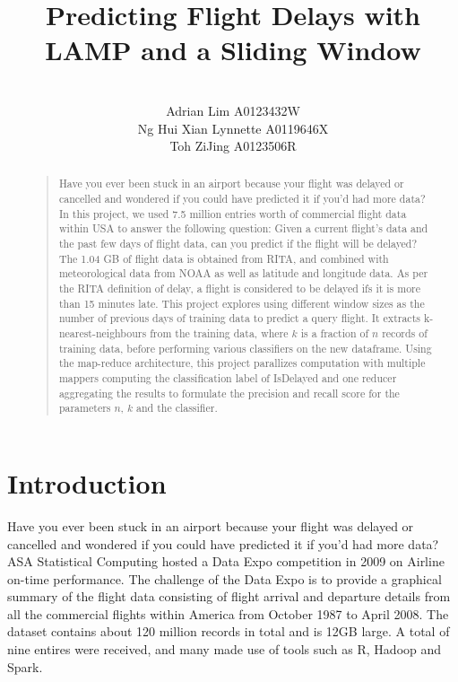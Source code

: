 \documentclass[letterpaper,11pt]{article}
\begin{document}
\title{Predicting Flight Delays with LAMP and a Sliding Window}
\author{\\Adrian Lim A0123432W \\
Ng Hui Xian Lynnette A0119646X \\
Toh ZiJing A0123506R }
\maketitle
\begin{abstract}
\begin{quote}
Have you ever been stuck in an airport because your flight was delayed or cancelled and wondered if you could have predicted it if you'd had more data? In this project, we used 7.5 million entries worth of commercial flight data within USA to answer the following question: Given a current flight's data and the past few days of flight data, can you predict if the flight will be delayed? The 1.04 GB of flight data is obtained from RITA, and combined with meteorological data from NOAA as well as latitude and longitude data. As per the RITA definition of delay, a flight is considered to be delayed ifs it is more than 15 minutes late. This project explores using different window sizes as the number of previous days of training data to predict a query flight. It extracts k-nearest-neighbours from the training data, where $k$ is a fraction of $n$ records of training data, before performing various classifiers on the new dataframe. Using the map-reduce architecture, this project parallizes computation with multiple mappers computing the classification label of IsDelayed and one reducer aggregating the results to formulate the precision and recall score for the parameters $n$, $k$ and the classifier.
\end{quote}
\end{abstract}

\section{Introduction}
Have you ever been stuck in an airport because your flight was delayed or cancelled and wondered if you could have predicted it if you'd had more data? ASA Statistical Computing hosted a Data Expo competition in 2009 \cite{asa_stat} on Airline on-time performance. The challenge of the Data Expo is to provide a graphical summary of the flight data consisting of flight arrival and departure details from all the commercial flights within America from October 1987 to April 2008. The dataset contains about 120 million records in total and is 12GB large. A total of nine entires were received, and many made use of tools such as R, Hadoop and Spark.
\end{document}
